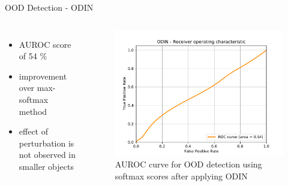 \documentclass[10pt, aspectratio=169]{beamer}
\begin{document}
\begin{frame}[allowframebreaks]{OOD Detection - ODIN}
        \begin{columns}
                \begin{itemize}
                    \item AUROC score of 54 \%
                    \item improvement over max-softmax method 
                    \item effect of perturbation is not observed in smaller objects
                \end{itemize}
                \begin{figure}[!ht]
                    \centering
                    \includegraphics[scale=0.45]{images/BDD100K vs IDD_ODIN_ROC.pdf}
                    \caption[SSD framework]{AUROC curve for OOD detection using softmax scores after applying ODIN}
                \end{figure}
        \end{columns}
\end{frame}
\end{document}
